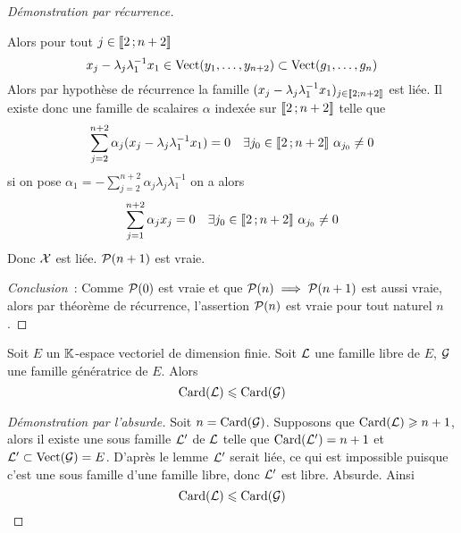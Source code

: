 \begin{proof}[Démonstration par récurrence]
\begin{enumerate}
      Alors pour tout \(j \in \intervalleentier{2}{n+2}\)
      \begin{equation}
        x_j - \lambda_j\lambda_1^{-1}x_1 \in \VectEngendre(y_1, \ldots, y_{n+2}) 
        \subset \VectEngendre(g_1, \ldots, g_n)
      \end{equation}
      Alors par hypothèse de récurrence la famille 
      \((x_j-\lambda_j\lambda_1^{-1}x_1)_{j \in \intervalleentier{2}{n+2}}\) est 
      liée. Il existe donc une famille de scalaires \(\alpha\) indexée sur 
      \(\intervalleentier{2}{n+2}\) telle que
      \begin{equation}
        \sum_{j=2}^{n+2} \alpha_j (x_j-\lambda_j\lambda_1^{-1}x_1) = 0 \quad 
        \exists j_0 \in \intervalleentier{2}{n+2} \ \alpha_{j_0} \neq 0
      \end{equation}
      si on pose \(\alpha_1=-\sum_{j=2}^{n+2} \alpha_j \lambda_j 
      \lambda_1^{-1}\) on a alors
      \begin{equation}
        \sum_{j=1}^{n+2} \alpha_j x_j =0 \quad \exists j_0 \in 
        \intervalleentier{2}{n+2} \ \alpha_{j_0} \neq 0
      \end{equation}
      Donc \(\X\) est liée. \(\P(n+1)\) est vraie.
  \end{enumerate}

  \emph{Conclusion}~: Comme \(\P(0)\) est vraie et que \(\P(n) \implies 
  \P(n+1)\) est aussi vraie, alors par théorème de récurrence, l'assertion 
  \(\P(n)\) est vraie pour tout naturel \(n\).
\end{proof}

\begin{cor}
  Soit \(E\) un \(\K\)-espace vectoriel de dimension finie. Soit \(\Lb\) une 
  famille libre de \(E\), \(\G\) une famille génératrice de \(E\). Alors
  \begin{equation}
    \Card(\Lb) \leqslant \Card(\G)
  \end{equation}
\end{cor}
\begin{proof}[Démonstration par l'absurde]
  Soit \(n = \Card(\G)\). Supposons que \(\Card(\Lb) \geqslant n+1\), alors il 
  existe une sous famille \(\Lb'\) de \(\Lb\) telle que \(\Card(\Lb')=n+1\) et 
  \(\Lb' \subset \VectEngendre(\G)=E\). D'après le lemme \(\Lb'\) serait liée, 
  ce qui est impossible puisque c'est une sous famille d'une famille libre, donc 
  \(\Lb'\) est libre. Absurde.  Ainsi \begin{equation}
    \Card(\Lb) \leqslant \Card(\G)
  \end{equation}
\end{proof}

